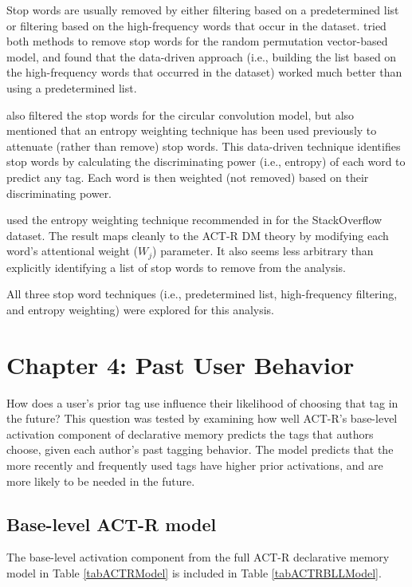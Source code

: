 \documentclass[man,floatsintext,donotrepeattitle]{apa6}
\begin{document}
Stop words are usually removed by either filtering based on a predetermined list or filtering based on the high-frequency words that occur in the dataset.
\textcite{Sahlgren2008} tried both methods to remove stop words for the random permutation vector-based model, and found that the data-driven approach
(i.e., building the list based on the high-frequency words that occurred in the dataset) worked much better than using a predetermined list.

\textcite{Jones2007} also filtered the stop words for the circular convolution model,
but also mentioned that an entropy weighting technique \parencite{Dumais1991} has been used previously to attenuate (rather than remove) stop words.
This data-driven technique identifies stop words by calculating the discriminating power (i.e., entropy) of each word to predict any tag.
Each word is then weighted (not removed) based on their discriminating power.

\textcite{Stanley2013} used the entropy weighting technique recommended in \textcite{Dumais1991} for the StackOverflow dataset.
The result maps cleanly to the ACT-R DM theory by modifying each word's attentional weight ($W_{j}$) parameter.
It also seems less arbitrary than explicitly identifying a list of stop words to remove from the analysis.

All three stop word techniques (i.e., predetermined list, high-frequency filtering, and entropy weighting) were explored for this analysis.

\clearpage
\section{Chapter 4: Past User Behavior}

How does a user's prior tag use influence their likelihood of choosing that tag in the future?
This question was tested by examining how well ACT-R's base-level activation component of declarative memory predicts the tags that authors choose, given each author's past tagging behavior.
The model predicts that the more recently and frequently used tags have higher prior activations, and are more likely to be needed in the future.

\subsection{Base-level ACT-R model}

The base-level activation component from the full ACT-R declarative memory model in Table \ref{tabACTRModel} is included in Table \ref{tabACTRBLLModel}.
\end{document}
